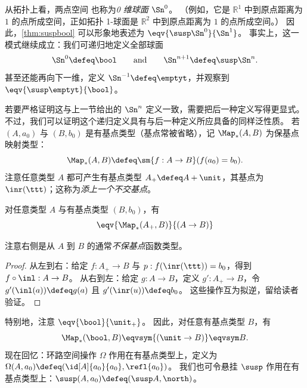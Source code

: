从拓扑上看，两点空间 \bool 也称为\emph{0 维球面} $\Sn^0$。
（例如，它是 $\mathbb{R}^1$ 中到原点距离为 $1$ 的点所成空间，正如拓扑 1-球面是 $\mathbb{R}^2$ 中到原点距离为 $1$ 的点所成空间。）
因此，\cref{thm:suspbool} 可以形象地表述为 $\eqv{\susp\Sn^0}{\Sn^1}$。
%
%
事实上，这一模式继续成立：我们可递归地定义全部球面
\begin{equation}\label{eq:Snsusp}
  \Sn^0 \defeq \bool
  \qquad\text{and}\qquad
  \Sn^{n+1} \defeq \susp \Sn^n.
\end{equation}
甚至还能再向下一维，定义 $\Sn^{-1}\defeq \emptyt$，并观察到 $\eqv{\susp\emptyt}{\bool}$。

若要严格证明这与上一节给出的 $\Sn^n$ 定义一致，需要把后一种定义写得更显式。
不过，我们可以证明这个递归定义具有与后一种定义所应具备的同样泛性质。
若 $(A,a_0)$ 与 $(B,b_0)$ 是有基点类型（基点常被省略），记 $\Map_*(A,B)$ 为保基点映射类型：
\[ \Map_*(A,B) \defeq \sm{f:A\to B} (f(a_0)=b_0). \]
注意任意类型 $A$ 都可产生有基点类型 $A_+ \defeq A+\unit$，其基点为 $\inr(\ttt)$；这称为\emph{添上一个不交基点}。
%
%
%

\begin{lem}
  对任意类型 $A$ 与有基点类型 $(B,b_0)$，有
  \[ \eqv{\Map_*(A_+,B)}{(A\to B)} \]
\end{lem}
注意右侧是从 $A$ 到 $B$ 的通常\emph{不保基点}函数类型。
\begin{proof}
  从左到右：给定 $f:A_+ \to B$ 与 $p:f(\inr(\ttt)) = b_0$，得到 $f\circ \inl : A \to B$。
  从右到左：给定 $g:A\to B$，定义 $g':A_+ \to B$，令 $g'(\inl(a))\defeq g(a)$ 且 $g'(\inr(u)) \defeq b_0$。
  这些操作互为拟逆，留给读者验证。
\end{proof}

特别地，注意 $\eqv{\bool}{\unit_+}$。
因此，对任意有基点类型 $B$，有
\[{\Map_*(\bool,B)} \eqvsym {(\unit \to B)}\eqvsym B.\]
%
现在回忆：环路空间操作 $\Omega$ 作用在有基点类型上，定义为 $\Omega(A,a_0) \defeq (\id[A]{a_0}{a_0},\refl{a_0})$。
我们也可令悬挂 $\susp$ 作用在有基点类型上：$\susp(A,a_0)\defeq (\susp A,\north)$。

